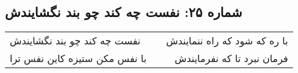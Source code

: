 \begin{center}
\section*{شماره ۲۵: نفست چه کند چو بند نگشایندش}
\label{sec:025}
\begin{longtable}{l p{0.5cm} r}
نفست چه کند چو بند نگشایندش
&&
با ره که شود که راه ننمایندش
\\
با نفس مکن ستیزه کاین نفس ترا
&&
فرمان نبرد تا که نفرمایندش
\\
\end{longtable}
\end{center}
